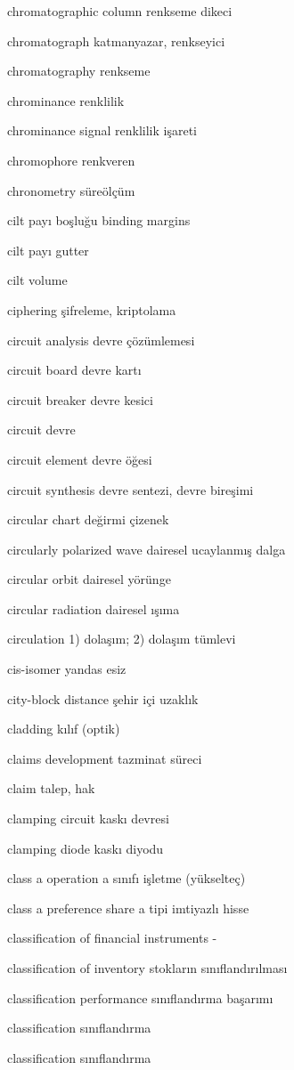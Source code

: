 \documentclass[12pt,fleqn]{article}\usepackage{../../common}
\begin{document}
chromatographic column renkseme dikeci

chromatograph katmanyazar, renkseyici

chromatography renkseme

chrominance renklilik

chrominance signal renklilik işareti

chromophore renkveren

chronometry süreölçüm

cilt payı boşluğu binding margins

cilt payı gutter

cilt volume

ciphering şifreleme, kriptolama

circuit analysis devre çözümlemesi

circuit board devre kartı

circuit breaker devre kesici

circuit devre

circuit element devre öğesi

circuit synthesis devre sentezi, devre bireşimi

circular chart değirmi çizenek

circularly polarized wave dairesel ucaylanmış dalga

circular orbit dairesel yörünge

circular radiation dairesel ışıma

circulation 1) dolaşım; 2) dolaşım tümlevi

cis-isomer yandas esiz

city-block distance şehir içi uzaklık

cladding kılıf (optik)

claims development tazminat süreci

claim talep, hak

clamping circuit kaskı devresi

clamping diode kaskı diyodu

class a operation a sınıfı işletme (yükselteç)

class a preference share a tipi imtiyazlı hisse

classification of financial instruments -

classification of inventory stokların sınıflandırılması

classification performance sınıflandırma başarımı

classification sınıflandırma

classification sınıflandırma
\end{document}
